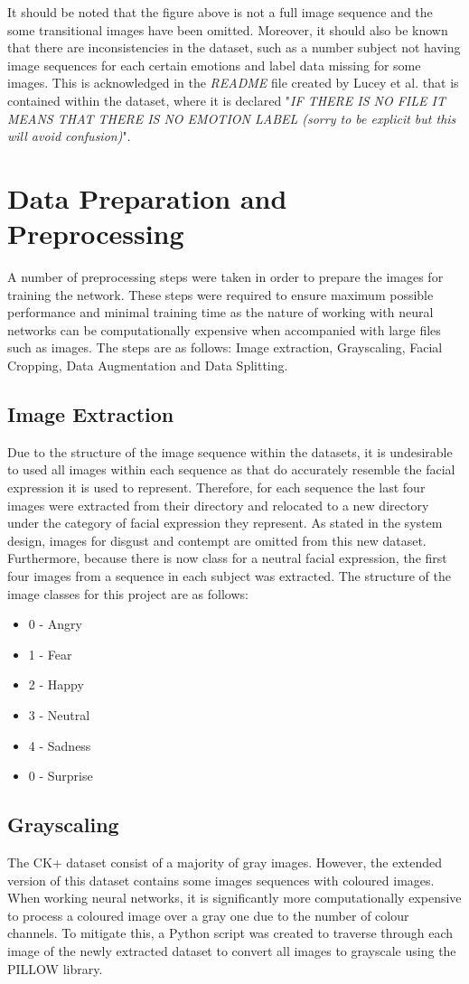 It should be noted that the figure above is not a full image sequence and the some transitional images have been omitted. Moreover, it should also be known that there are inconsistencies in the dataset, such as a number subject not having image sequences for each certain emotions and label data missing for some images. This is acknowledged in the \textit{README} file created by Lucey et al. that is contained within the dataset, where it is declared "\textit{IF THERE IS NO FILE IT MEANS THAT THERE IS NO EMOTION LABEL (sorry to be explicit but this will avoid confusion)}". 
\section{Data Preparation and Preprocessing}
A number of preprocessing steps were taken in order to prepare the images for training the network. These steps were required to ensure maximum possible performance and minimal training time as the nature of working with neural networks can be computationally expensive when accompanied with large files such as images. The steps are as follows: Image extraction, Grayscaling, Facial Cropping, Data Augmentation and Data Splitting. 
\subsection{Image Extraction}
Due to the structure of the image sequence within the datasets, it is undesirable to used all images within each sequence as that do accurately resemble the facial expression it is used to represent. Therefore, for each sequence the last four images were extracted from their directory and relocated to a new directory under the category of facial expression they represent. As stated in the system design, images for disgust and contempt are omitted from this new dataset. Furthermore, because there is now class for a neutral facial expression, the first four images from a sequence in each subject was extracted.
The structure of the image classes for this project are as follows:
\begin{itemize}
	\item 0 - Angry
	\item 1 - Fear
	\item 2 - Happy
	\item 3 - Neutral
	\item 4 - Sadness
	\item 0 - Surprise	
\end{itemize}


\subsection{Grayscaling}
The CK+ dataset consist of a majority of gray images. However, the extended version of this dataset contains some images sequences with coloured images. When working neural networks, it is significantly more computationally expensive to process a coloured image over a gray one due to the number of colour channels. To mitigate this, a Python script was created to traverse through each image of the newly extracted dataset to convert all images to grayscale using the PILLOW library. \\

